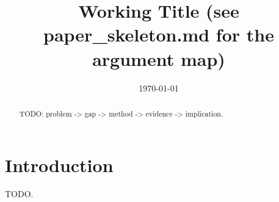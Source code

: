\documentclass[11pt]{article}
\title{Working Title (see paper\_skeleton.md for the argument map)}
\author{}
\date{\today}
\begin{document}
\maketitle

\begin{abstract}
TODO: problem -> gap -> method -> evidence -> implication.
\end{abstract}

\section{Introduction}
TODO.


% 
% 
\end{document}
